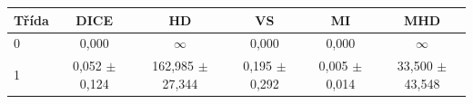 \begin{tabular}{l c c c c c}
 \hline
Třída & DICE & HD & VS & MI & MHD \\ \hline
0 & 0,000 & $\infty$ & 0,000 & 0,000 & $\infty$ \\
1 & 0,052 $\pm$ 0,124 & 162,985 $\pm$ 27,344 & 0,195 $\pm$ 0,292 & 0,005 $\pm$ 0,014 & 33,500 $\pm$ 43,548 \\
\hline 
 \end{tabular}
